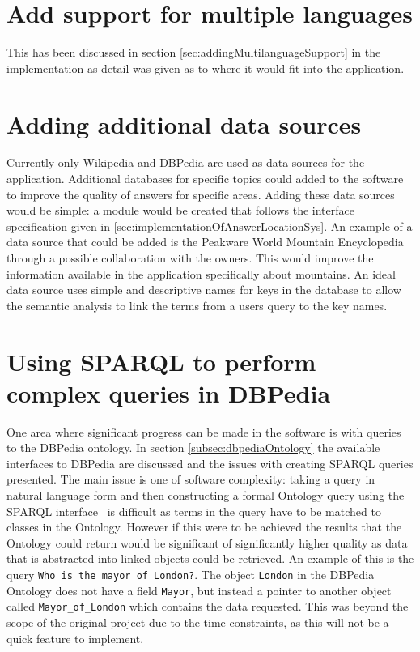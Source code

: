 \documentclass[authoryearcitations]{UoYCSproject}
\begin{document}
\section{Add support for multiple languages}
\label{sec:evalMultipleLanguages}
This has been discussed in section \ref{sec:addingMultilanguageSupport} in the implementation as detail was given as to where it would fit into the application. 

\section{Adding additional data sources}
\label{sec:evalAdditionalSources}
Currently only Wikipedia and DBPedia are used as data sources for the application. Additional databases for specific topics could added to the software to improve the quality of answers for specific areas. Adding these data sources would be simple: a module would be created that follows the interface specification given in \ref{sec:implementationOfAnswerLocationSys}. An example of a data source that could be added is the Peakware World Mountain Encyclopedia~\cite{peakware} through a possible collaboration with the owners. This would improve the information available in the application specifically about mountains. An ideal data source uses simple and descriptive names for keys in the database to allow the semantic analysis to link the terms from a users query to the key names.

\section{Using SPARQL to perform complex queries in DBPedia}
\label{sec:evalSparql}
One area where significant progress can be made in the software is with queries to the DBPedia ontology. In section \ref{subsec:dbpediaOntology} the available interfaces to DBPedia are discussed and the issues with creating SPARQL queries presented. The main issue is one of software complexity: taking a query in natural language form and then constructing a formal Ontology query using the SPARQL interface~\cite{dbPediaSparql} is difficult as terms in the query have to be matched to classes in the Ontology. However if this were to be achieved the results that the Ontology could return would be significant of significantly higher quality as data that is abstracted into linked objects could be retrieved. An example of this is the query \texttt{Who is the mayor of London?}. The object \texttt{London} in the DBPedia Ontology does not have a field \texttt{Mayor}, but instead a pointer to another object called \texttt{Mayor\_of\_London} which contains the data requested. This was beyond the scope of the original project due to the time constraints, as this will not be a quick feature to implement.
\end{document}
